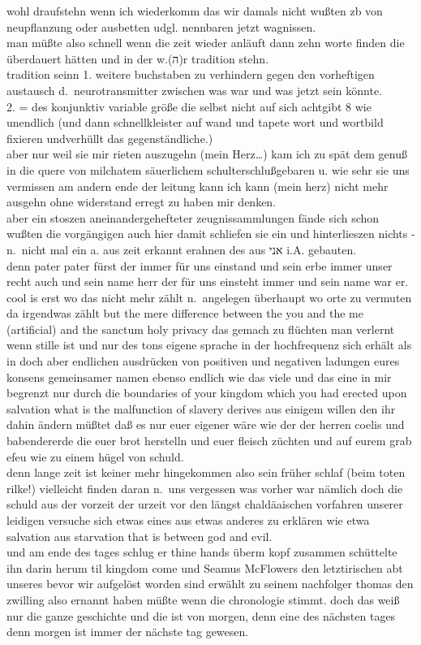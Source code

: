\documentclass[
]{article}
\begin{document}
wohl draufstehn wenn ich wiederkomm das wir damals nicht wußten zb von
neupflanzung oder ausbetten udgl. nennbaren jetzt wagnissen.\\
man müßte also schnell wenn die zeit wieder anläuft dann zehn worte
finden die überdauert hätten und in der w.(ה)r tradition stehn.\\
tradition seinn 1. weitere buchstaben zu verhindern gegen den
vorheftigen austausch d.~neurotransmitter zwischen was war und was jetzt
sein könnte.\\
2. = des konjunktiv variable größe die selbst nicht auf sich achtgibt 8
wie unendlich (und dann schnellkleister auf wand und tapete wort und
wortbild fixieren undverhüllt das gegenständliche.)\\
aber nur weil sie mir rieten auszugehn (mein Herz\ldots) kam ich zu spät
dem genuß in die quere von milchatem säuerlichem schulterschlußgebaren
u. wie sehr sie uns vermissen am andern ende der leitung kann ich kann
(mein herz) nicht mehr ausgehn ohne widerstand erregt zu haben mir
denken.\\
aber ein stoszen aneinandergehefteter zeugnissammlungen fände sich schon
wußten die vorgängigen auch hier damit schliefen sie ein und
hinterlieszen nichts - n.~nicht mal ein a. aus zeit erkannt erahnen des
aus אני i.A. gebauten.\\
denn pater pater fürst der immer für uns einstand und sein erbe immer
unser recht auch und sein name herr der für uns einsteht immer und sein
name war er. cool is erst wo das nicht mehr zählt n.~angelegen überhaupt
wo orte zu vermuten da irgendwas zählt but the mere difference between
the you and the me (artificial) and the sanctum holy privacy das gemach
zu flüchten man verlernt wenn stille ist und nur des tons eigene sprache
in der hochfrequenz sich erhält als in doch aber endlichen ausdrücken
von positiven und negativen ladungen eures konsens gemeinsamer namen
ebenso endlich wie das viele und das eine in mir begrenzt nur durch die
boundaries of your kingdom which you had erected upon salvation what is
the malfunction of slavery derives aus einigem willen den ihr dahin
ändern müßtet daß es nur euer eigener wäre wie der der herren coelis und
babendererde die euer brot herstelln und euer fleisch züchten und auf
eurem grab efeu wie zu einem hügel von schuld.\\
denn lange zeit ist keiner mehr hingekommen also sein früher schlaf
(beim toten rilke!) vielleicht finden daran n.~uns vergessen was vorher
war nämlich doch die schuld aus der vorzeit der urzeit vor den längst
chaldäaischen vorfahren unserer leidigen versuche sich etwas eines aus
etwas anderes zu erklären wie etwa salvation aus starvation that is
between god and evil.\\
und am ende des tages schlug er thine hands überm kopf zusammen
schüttelte ihn darin herum til kingdom come und Seamus McFlowers den
letztirischen abt unseres bevor wir aufgelöst worden sind erwählt zu
seinem nachfolger thomas den zwilling also ernannt haben müßte wenn die
chronologie stimmt. doch das weiß nur die ganze geschichte und die ist
von morgen, denn eine des nächsten tages denn morgen ist immer der
nächste tag gewesen.
\end{document}
